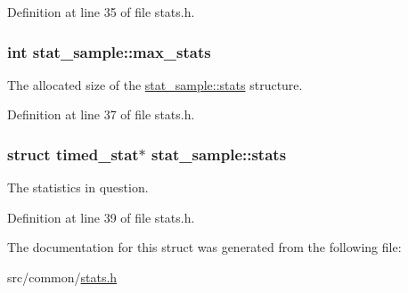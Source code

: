 Definition at line 35 of file stats.\-h.

\hypertarget{structstat__sample_a9915339fedc4af2eee8ded2869cdb351}{
\subsubsection[{max\-\_\-stats}]{\setlength{\rightskip}{0pt plus 5cm}int stat\-\_\-sample\-::max\-\_\-stats}}\label{structstat__sample_a9915339fedc4af2eee8ded2869cdb351}


The allocated size of the \hyperlink{structstat__sample_aa1e64901d0a1f17a163714488baa99fb}{stat\-\_\-sample\-::stats} structure. 



Definition at line 37 of file stats.\-h.

\hypertarget{structstat__sample_aa1e64901d0a1f17a163714488baa99fb}{
\subsubsection[{stats}]{\setlength{\rightskip}{0pt plus 5cm}struct {\bf timed\-\_\-stat}$\ast$ stat\-\_\-sample\-::stats}}\label{structstat__sample_aa1e64901d0a1f17a163714488baa99fb}


The statistics in question. 



Definition at line 39 of file stats.\-h.



The documentation for this struct was generated from the following file\-:\begin{DoxyCompactItemize}
\item 
src/common/\hyperlink{stats_8h}{stats.\-h}\end{DoxyCompactItemize}
